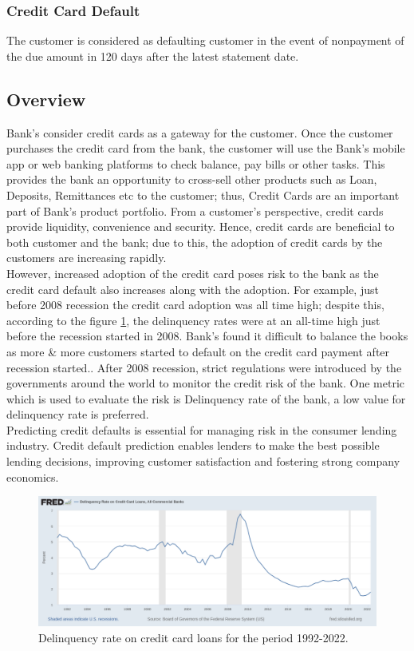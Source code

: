 \documentclass[twoside,11pt,a4paper]{article}
\begin{document}
\subsubsection{Credit Card Default}
The customer is considered as defaulting customer in the event of nonpayment of the due amount in 120 days after the latest statement date.
\subsection{Overview}
Bank's consider credit cards as a gateway for the customer. Once the customer purchases the credit card from the bank, the customer will use the Bank's mobile app or web banking platforms to check balance, pay bills or other tasks. This provides the bank an opportunity to cross-sell other products such as Loan, Deposits, Remittances etc to the customer; thus, Credit Cards are an important part of Bank's product portfolio. From a customer's perspective, credit cards provide liquidity, convenience and security. Hence, credit cards are beneficial to both customer and the bank; due to this, the adoption of credit cards by the customers are increasing rapidly.\\

However, increased adoption of the credit card poses risk to the bank as the credit card default also increases along with the adoption. For example, just before 2008 recession the credit card adoption was all time high; despite this, according to the  figure \ref{fig:fredgraph}, the delinquency rates were at an all-time high just before the recession started in 2008. Bank's found it difficult to balance the books as more \& more customers started to default on the credit card payment after recession started.. After 2008 recession, strict regulations were introduced by the governments around the world to monitor the credit risk of the bank. One metric which is used to evaluate the risk is Delinquency rate of the bank, a low value for delinquency rate is preferred.\\

Predicting credit defaults is essential for managing risk in the consumer lending industry. Credit default prediction enables lenders to make the best possible lending decisions, improving customer satisfaction and fostering strong company economics. \\

\begin{figure}[ht]
	\centering
	\includegraphics[width=1.0\textwidth]{fredgraph}
	\caption[Delinquency rate on credit card loans for the period 1992-2022]{Delinquency rate on credit card loans for the period 1992-2022{\citep{fedgraph_delinquency_history}}.}
	\label{fig:fredgraph}
\end{figure}
\end{document}
